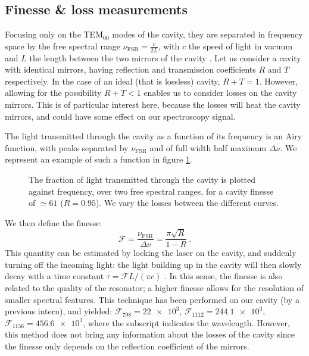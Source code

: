 \documentclass[11pt]{article}
\newcommand{\mathsc}[1]{\mathrm{\scriptscriptstyle {#1}}}
\numberwithin{equation}{section}
\numberwithin{figure}{section}
\begin{document}
\subsection{Finesse \& loss measurements}

Focusing only on the TEM$_{00}$ modes of the cavity, they are separated in frequency space by the free spectral range $\nu_\mathsc{FSR} = \frac{c}{2L}$, with $c$ the speed of light in vacuum and $L$ the length between the two mirrors of the cavity \citep[see for instance][for a more detailed theory of cavities]{2013_martin}. Let us consider a cavity with identical mirrors,  having reflection and transmission coefficients $R$ and $T$ respectively. In the case of an ideal (that is lossless) cavity, $R+T=1$. However, allowing for the possibility $R + T < 1$ enables us to consider losses on the cavity mirrors. This is of particular interest here, because the losses will heat the cavity mirrors, and could have some effect on our spectroscopy signal. 


The light transmitted through the cavity as a function of its frequency is an Airy function, with peaks separated by $\nu_\mathsc{FSR}$ and of full width half maximum $\Delta \nu$. We represent an example of such a function in figure \ref{fig:cavity_transmission}. 
%
\begin{figure}[htbp]
	\centering
    
	\caption{\small The fraction of light transmitted through the cavity is plotted against frequency, over two free spectral ranges, for a cavity finesse of $\simeq 61$ ($R = 0.95$). We vary the losses between the different curves.}
    \label{fig:cavity_transmission}
\end{figure}
%

We then define the finesse:
%
\begin{equation}
	\mathcal{F} = \frac{\nu_\mathsc{FSR}}{\Delta \nu} = \frac{\pi \sqrt{R}}{1 - R}~.
\end{equation}
%
This quantity can be estimated by locking the laser on the cavity, and suddenly turning off the incoming light: the light building up in the cavity will then slowly decay with a time constant $\tau = \mathcal{F} L /(\pi c)$ \citep{2013_martin}. In this sense, the finesse is also related to the quality of the resonator; a higher finesse allows for the resolution of smaller spectral features.  This technique has been performed on our cavity (by a previous intern), and yielded: $\mathcal{F}_{798} = \num{22e3}$, $\mathcal{F}_{1112} = \num{244.1e3}$, $\mathcal{F}_{1156} = \num{456.6e3}$, where the subscript indicates the wavelength. However, this method does not bring any information about the losses of the cavity since the finesse only depends on the reflection coefficient of the mirrors.
\end{document}
